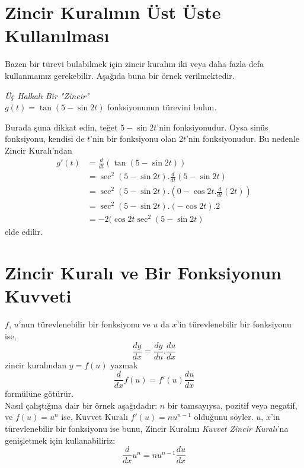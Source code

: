 \section{\protect Zincir Kuralının Üst Üste Kullanılması}
Bazen bir türevi bulabilmek için zincir kuralını iki veya daha fazla defa kullanmamız gerekebilir. Aşağıda buna bir örnek verilmektedir.
\begin{ornek}\textit{Üç Halkalı Bir "Zincir"}\\
$g(t)=\tan (5-\sin{2t})$ fonksiyonunun türevini bulun.
\end{ornek}
\begin{cozum} Burada şuna dikkat edin, teğet $5-\sin{2t}$'nin fonksiyonudur. Oysa sinüs fonksiyonu, kendisi de $t$'nin bir fonksiyonu olan $2t$'nin fonksiyonudur. Bu nedenle Zincir Kuralı'ndan
	\begin{equation*}
	\begin{split}
	g'(t)&=\frac{d}{dt}(\tan (5-\sin{2t}))\\
		&=\sec ^2(5-\sin{2t}).\frac{d}{dt}(5-\sin{2t})\\
		&=\sec ^2(5-\sin{2t}).\left(0-\cos{2t}.\frac{d}{dt}(2t)\right)\\
		&=\sec ^2(5-\sin{2t}).(-\cos {2t}).2\\
		&=-2(\cos{2t}\sec ^2(5-\sin{2t})
	\end{split}
	\end{equation*}
elde edilir.
\end{cozum}
\section{\protect Zincir Kuralı ve Bir Fonksiyonun Kuvveti}
$f$, $u$'nun türevlenebilir bir fonksiyonu ve $u$ da $x$'in türevlenebilir bir fonksiyonu ise,
	\begin{equation*}
	\frac{dy}{dx}=\frac{dy}{du}.\frac{du}{dx}
	\end{equation*}
zincir kuralından $y=f(u)$ yazmak
	\begin{equation*}
	\frac{d}{dx}f(u)=f'(u)\frac{du}{dx}
	\end{equation*}
formülüne götürür.\\
	Nasıl çalıştığına dair bir örnek aşağıdadır: $n$ bir tamsayıysa, pozitif veya negatif, ve $f(u)=u^n$ ise, Kuvvet Kuralı $f'(u)=nu^{n-1}$ olduğunu söyler. $u$, $x$'in türevlenebilir bir fonksiyonu ise bunu, Zincir Kuralını \textit{Kuvvet Zincir Kuralı}'na genişletmek için kullanabiliriz:
	\begin{equation*}
	\frac{d}{dx}u^n=nu^{n-1}\frac{du}{dx}
	\end{equation*}\\


